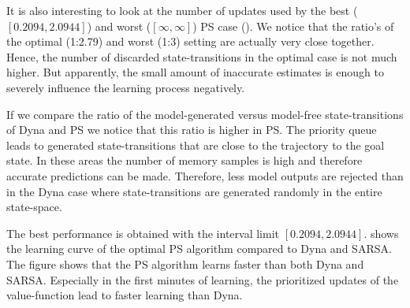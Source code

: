 
It is also interesting to look at the number of updates used by the best ($[0.2094,2.0944]$) and worst ($[\infty,\infty]$) \ac{PS} case (). We notice that the ratio's of the optimal (1:2.79) and worst (1:3) setting are actually very close together. Hence, the number of discarded state-transitions in the optimal case is not much higher. But apparently, the small amount of inaccurate estimates is enough to severely influence the learning process negatively.

If we compare the ratio of the model-generated versus model-free state-transitions of Dyna and \ac{PS} we notice that this ratio is higher in \ac{PS}. The priority queue leads to generated state-transitions that are close to the trajectory to the goal state. In these areas the number of memory samples is high and therefore accurate predictions can be made. Therefore, less model outputs are rejected than in the Dyna case where state-transitions are generated randomly in the entire state-space.

The best performance is obtained with the interval limit $[0.2094,2.0944]$.  shows the learning curve of the optimal \ac{PS} algorithm compared to Dyna and SARSA. The figure shows that the \ac{PS} algorithm learns faster than both Dyna and SARSA. Especially in the first minutes of learning, the prioritized updates of the value-function lead to faster learning than Dyna.




